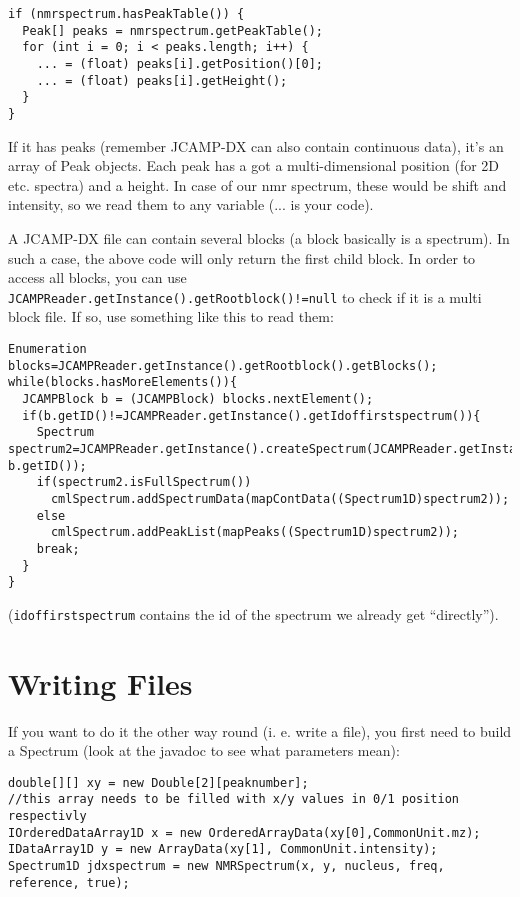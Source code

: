 \documentclass[a4paper]{book}
\begin{document}
\begin{verbatim}
if (nmrspectrum.hasPeakTable()) {
  Peak[] peaks = nmrspectrum.getPeakTable();
  for (int i = 0; i < peaks.length; i++) {
    ... = (float) peaks[i].getPosition()[0];
    ... = (float) peaks[i].getHeight();
  }
}
\end{verbatim}

If it has peaks (remember JCAMP-DX can also contain continuous data), it's an
array of Peak objects. Each peak has a got a multi-dimensional position (for 2D
etc. spectra) and a height. In case of our nmr spectrum, these would be shift
and intensity, so we read them to any variable (... is your code).

A JCAMP-DX file can contain several blocks (a block basically is a spectrum). In
such a case, the above code will only return the first child block. In order to
access all blocks, you can use
\texttt{JCAMPReader.getInstance().getRootblock()!=null} to check if it is a
multi block file. If so, use something like this to read them:

\begin{verbatim}
Enumeration blocks=JCAMPReader.getInstance().getRootblock().getBlocks();
while(blocks.hasMoreElements()){
  JCAMPBlock b = (JCAMPBlock) blocks.nextElement();
  if(b.getID()!=JCAMPReader.getInstance().getIdoffirstspectrum()){
    Spectrum spectrum2=JCAMPReader.getInstance().createSpectrum(JCAMPReader.getInstance().rootblock, b.getID());
    if(spectrum2.isFullSpectrum())
      cmlSpectrum.addSpectrumData(mapContData((Spectrum1D)spectrum2));
    else
      cmlSpectrum.addPeakList(mapPeaks((Spectrum1D)spectrum2));
    break;
  }
}
\end{verbatim}

(\texttt{idoffirstspectrum} contains the id of the spectrum we already get ``directly'').

\section{Writing Files}

If you want to do it the other way round (i. e. write a file), you first need to
build a Spectrum (look at the javadoc to see what parameters mean):

\begin{verbatim}
double[][] xy = new Double[2][peaknumber];
//this array needs to be filled with x/y values in 0/1 position respectivly
IOrderedDataArray1D x = new OrderedArrayData(xy[0],CommonUnit.mz);
IDataArray1D y = new ArrayData(xy[1], CommonUnit.intensity);
Spectrum1D jdxspectrum = new NMRSpectrum(x, y, nucleus, freq, reference, true);
\end{verbatim}
\end{document}
